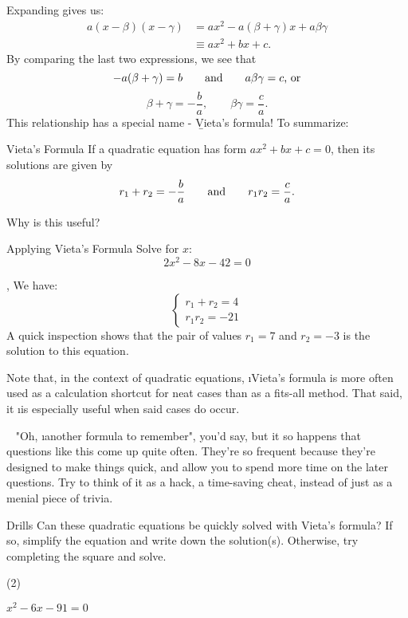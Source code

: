 Expanding gives us:
\begin{align}
    a(x-\beta)(x-\gamma)
    &= ax^2-a(\beta+\gamma)x+a\beta\gamma \\
    &\equiv ax^2+bx+c.
\end{align}
By comparing the last two expressions, we see that
$$-a(\beta+\gamma)=b\qquad\text{and}\qquad a\beta\gamma=c\text{, or}$$
$$\beta+\gamma=-\frac{b}{a},\qquad\beta\gamma=\frac{c}{a}.$$
This relationship has a special name - \b{Vieta's formula}! To summarize:
\begin{theorem}{Vieta's Formula}
If a quadratic equation has form $ax^2+bx+c=0$, then its solutions are given by $$r_1+r_2=-\frac{b}{a}\qquad\text{and}\qquad r_1r_2=\frac{c}{a}.$$
\end{theorem}

Why is this useful? %

\begin{example}{Applying Vieta's Formula}
Solve for $x$: $$2x^2-8x-42=0$$

\sep
We have:
$$\begin{cases}
        r_1+r_2=4 \\
        r_1r_2=-21
    \end{cases}$$
A quick inspection shows that the pair of values $r_1=7$ and $r_2=-3$ is the solution to this equation.
\end{example}
Note that, in the context of quadratic equations, \i{Vieta's formula is more often used as a calculation shortcut for neat cases than as a fits-all method.} That said, it \i{is} especially useful when said cases do occur.
\begin{insight}{~}
"Oh, \i{another} formula to remember", you'd say, but it so happens that questions like this come up quite often. They're so frequent because they're designed to make things quick, and allow you to spend more time on the later questions. Try to think of it as a hack, a time-saving cheat, instead of just as a menial piece of trivia.
\end{insight}

\begin{questions}{Drills}
Can these quadratic equations be quickly solved with Vieta's formula? If so, simplify the equation and write down the solution(s). Otherwise, try completing the square and solve.
\begin{question_set}(2)
    \item $x^2-6x-91=0$
    \item $ $
    \item $ $
    \item $ $
    \item $ $
    \item $ $
\end{question_set}
\end{questions}

